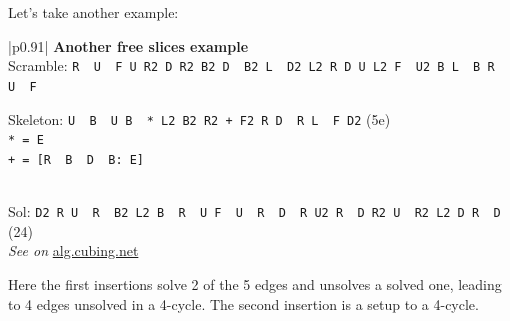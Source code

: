 \documentclass[11pt,a4paper]{book}
\newcommand{\p}{\textquotesingle}
\newcommand{\m}{\texttt}
\newcommand{\ps}{\p\,\,}
\begin{document}
Let's take another example:

\bigskip
\begin{tabular}{|p{}|}
\hline
\textbf{Another free slices example}\\
\hline
Scramble: \m{R\ps U\ps F U R2 D R2 B2 D\ps B2 L\ps D2 L2 R D U L2 F\ps U2 B L\ps B R\ps U\ps F}\\
\hline
\begin{minipage}[l]{0.650\textwidth}
Skeleton: \m{U\ps B\ps U B\ps * L2 B2 R2 + F2 R D\ps R L\ps F D2} (5e)\\
\m{* = E\ps}\\
\m{+ = [R\ps B\ps D\ps B: E]}
\end{minipage}
\begin{minipage}[c]{0.25\textwidth}

\end{minipage}\\
\hline
Sol: \m{D2 R U\ps R\ps B2 L2 B\ps R\ps U F\ps U\ps R\ps D\ps R U2 R\ps D R2 U\ps R2 L2 D R\ps D\p} (24)\\
\hline
\emph{See on }\href{https://alg.cubing.net/?alg=U-_B-_U_B-_E-_L2_B2_R2_\%5BR-_B-_D-_B:_E\%5D_F2_R_D-_R_L-_F_D2&setup=R-_U-_F_U_R2_D_R2_B2_D-_B2_L-_D2_L2_R_D_U_L2_F-_U2_B_L-_B_R-_U-_F}{alg.cubing.net}\\
\hline
\end{tabular}
\bigskip

Here the first insertions solve 2 of the 5 edges and unsolves a solved one, leading to 4 edges unsolved in a 4-cycle. The second insertion is a setup to a 4-cycle.
\end{document}

